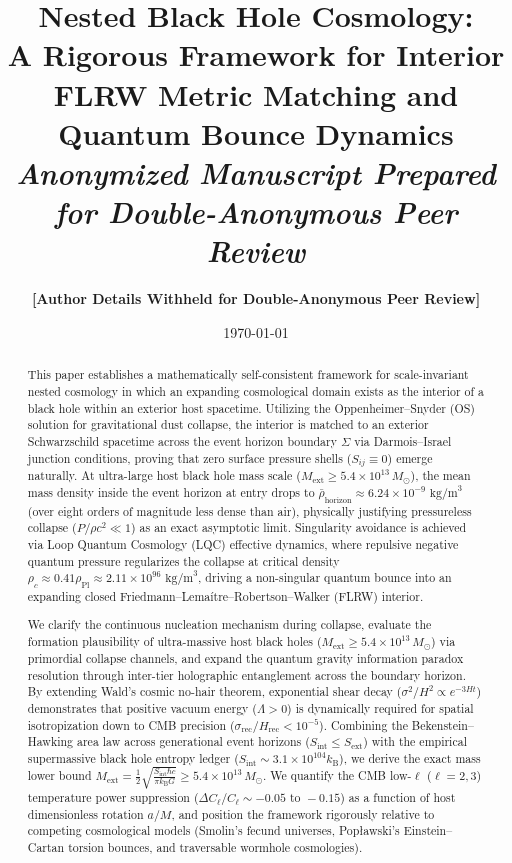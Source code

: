 \documentclass[11pt,a4paper]{article}
\title{\textbf{Nested Black Hole Cosmology:\\A Rigorous Framework for Interior FLRW Metric Matching and Quantum Bounce Dynamics}\\[0.5em]
\large \textit{Anonymized Manuscript Prepared for Double-Anonymous Peer Review}}
\author{\textbf{[Author Details Withheld for Double-Anonymous Peer Review]}}
\date{\today}
\theoremstyle{definition}
\begin{document}
\maketitle

\begin{abstract}
\noindent This paper establishes a mathematically self-consistent framework for scale-invariant nested cosmology in which an expanding cosmological domain exists as the interior of a black hole within an exterior host spacetime. Utilizing the Oppenheimer--Snyder (OS) solution for gravitational dust collapse, the interior is matched to an exterior Schwarzschild spacetime across the event horizon boundary $\Sigma$ via Darmois--Israel junction conditions, proving that zero surface pressure shells ($S_{ij} \equiv 0$) emerge naturally. At ultra-large host black hole mass scale ($M_{\text{ext}} \ge 5.4 \times 10^{13} \, M_\odot$), the mean mass density inside the event horizon at entry drops to $\bar{\rho}_{\text{horizon}} \approx 6.24 \times 10^{-9} \text{ kg/m}^3$ (over eight orders of magnitude less dense than air), physically justifying pressureless collapse ($P/\rho c^2 \ll 1$) as an exact asymptotic limit. Singularity avoidance is achieved via Loop Quantum Cosmology (LQC) effective dynamics, where repulsive negative quantum pressure regularizes the collapse at critical density $\rho_c \approx 0.41 \rho_{\text{Pl}} \approx 2.11 \times 10^{96} \text{ kg/m}^3$, driving a non-singular quantum bounce into an expanding closed Friedmann--Lema\'itre--Robertson--Walker (FLRW) interior.

We clarify the continuous nucleation mechanism during collapse, evaluate the formation plausibility of ultra-massive host black holes ($M_{\text{ext}} \ge 5.4 \times 10^{13} \, M_\odot$) via primordial collapse channels, and expand the quantum gravity information paradox resolution through inter-tier holographic entanglement across the boundary horizon. By extending Wald's cosmic no-hair theorem, exponential shear decay ($\sigma^2/H^2 \propto e^{-3Ht}$) demonstrates that positive vacuum energy ($\Lambda > 0$) is dynamically required for spatial isotropization down to CMB precision ($\sigma_{\text{rec}}/H_{\text{rec}} < 10^{-5}$). Combining the Bekenstein--Hawking area law across generational event horizons ($S_{\text{int}} \le S_{\text{ext}}$) with the empirical supermassive black hole entropy ledger ($S_{\text{int}} \sim 3.1 \times 10^{104} k_{\text{B}}$), we derive the exact mass lower bound $M_{\text{ext}} = \frac{1}{2}\sqrt{\frac{S_{\text{int}}\hbar c}{\pi k_{\text{B}} G}} \ge 5.4 \times 10^{13} \, M_\odot$. We quantify the CMB low-$\ell$ ($\ell=2,3$) temperature power suppression ($\Delta C_\ell / C_\ell \sim -0.05 \text{ to } -0.15$) as a function of host dimensionless rotation $a/M$, and position the framework rigorously relative to competing cosmological models (Smolin's fecund universes, Pop\l awski's Einstein--Cartan torsion bounces, and traversable wormhole cosmologies).
\end{abstract}
\end{document}
